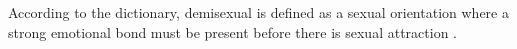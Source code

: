 According to the dictionary, demisexual is defined as a sexual orientation
where a strong emotional bond must be present before there is sexual 
attraction \cite{demisexual-def}.
